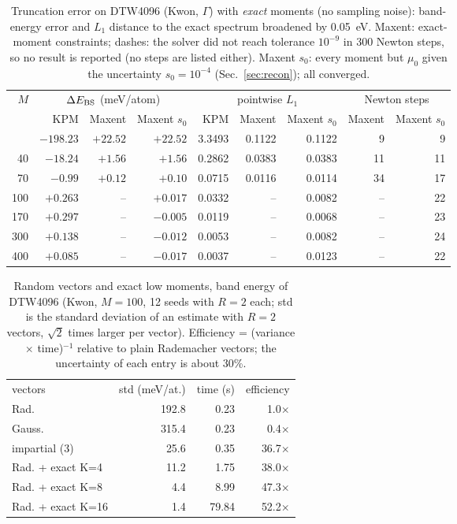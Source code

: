 \begin{table}[t]\caption{Truncation error on DTW4096 (Kwon, $\Gamma$) with \emph{exact} moments (no sampling noise): band-energy error and $L_1$ distance to the exact spectrum broadened by 0.05~eV. Maxent: exact-moment constraints; dashes: the solver did not reach tolerance $10^{-9}$ in 300 Newton steps, so no result is reported (no steps are listed either). Maxent $s_0$: every moment but $\mu_0$ given the uncertainty $s_0=10^{-4}$ (Sec.~\ref{sec:recon}); all converged.}\label{tab:acc}\begin{ruledtabular}\begin{tabular}{rrrrrrrrr}
$M$ & \multicolumn{3}{c}{$\Delta E_{\rm BS}$ (meV/atom)} & \multicolumn{3}{c}{pointwise $L_1$} & \multicolumn{2}{c}{Newton steps} \\ & KPM & Maxent & Maxent $s_0$ & KPM & Maxent & Maxent $s_0$ & Maxent & Maxent $s_0$ \\ \colrule
20 & $-198.23$ & $+22.52$ & $+22.52$ & 3.3493 & 0.1122 & 0.1122 & 9 & 9 \\
40 & $-18.24$ & $+1.56$ & $+1.56$ & 0.2862 & 0.0383 & 0.0383 & 11 & 11 \\
70 & $-0.99$ & $+0.12$ & $+0.10$ & 0.0715 & 0.0116 & 0.0114 & 34 & 17 \\
100 & $+0.263$ & -- & $+0.017$ & 0.0332 & -- & 0.0082 & -- & 22 \\
170 & $+0.297$ & -- & $-0.005$ & 0.0119 & -- & 0.0068 & -- & 23 \\
300 & $+0.138$ & -- & $-0.012$ & 0.0053 & -- & 0.0082 & -- & 24 \\
400 & $+0.085$ & -- & $-0.017$ & 0.0037 & -- & 0.0123 & -- & 22 \\
\end{tabular}\end{ruledtabular}\end{table}

\begin{table}[t]\caption{Random vectors and exact low moments, band energy of DTW4096 (Kwon, $M=100$, 12 seeds with $R=2$ each; std is the standard deviation of an estimate with $R=2$ vectors, $\sqrt2$ times larger per vector). Efficiency = (variance $\times$ time)$^{-1}$ relative to plain Rademacher vectors; the uncertainty of each entry is about 30\%.}\label{tab:vec}\begin{ruledtabular}\begin{tabular}{lrrr}
vectors & std (meV/at.) & time (s) & efficiency \\ \colrule
Rad. & 192.8 & 0.23 & 1.0$\times$ \\
Gauss. & 315.4 & 0.23 & 0.4$\times$ \\
impartial (3) & 25.6 & 0.35 & 36.7$\times$ \\
Rad. + exact K=4 & 11.2 & 1.75 & 38.0$\times$ \\
Rad. + exact K=8 & 4.4 & 8.99 & 47.3$\times$ \\
Rad. + exact K=16 & 1.4 & 79.84 & 52.2$\times$ \\
\end{tabular}\end{ruledtabular}\end{table}

